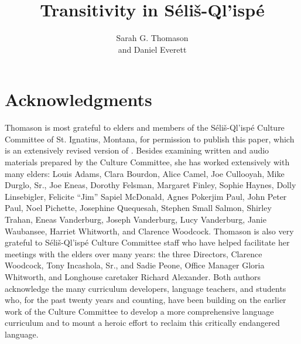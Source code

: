 \documentclass[output=paper,colorlinks,citecolor=brown]{langscibook}
\title{Transitivity in S\'eli\v{s}-Ql'isp\'e}
\author{Sarah G. Thomason \affiliation{University of Michigan}\\ and
       Daniel Everett \affiliation{Bentley University}}
\begin{document}
\maketitle




\section*{Acknowledgments}

Thomason is most
   grateful to elders and members of the S\'eli\v{s}-Ql'isp\'e
   Culture Committee of St. Ignatius, Montana, for permission to
   publish this paper, which is an extensively revised version of
   \cite{S.Thomason&Everett:1993}.  Besides examining written and
   audio materials prepared by the Culture Committee, she has worked
   extensively with many elders: {\dag}Louis Adams, {\dag}Clara
   Bourdon, {\dag}Alice Camel, {\dag}Joe Cullooyah, {\dag}Mike
   Durglo, Sr., {\dag}Joe Eneas, {\dag}Dorothy Felsman,
   {\dag}Margaret Finley, Sophie Haynes, {\dag}Dolly Linsebigler,
   {\dag}Felicite ``Jim'' Sapiel McDonald, {\dag}Agnes Pokerjim Paul,
   {\dag}John Peter Paul, {\dag}Noel Pichette, {\dag}Josephine
   Quequesah, Stephen Small Salmon, Shirley Trahan, {\dag}Eneas
   Vanderburg, {\dag}Joseph Vanderburg, Lucy Vanderburg, {\dag}Janie
   Waubansee, {\dag}Harriet Whitworth, and {\dag}Clarence Woodcock.
   Thomason is also very grateful to S\'eli\v{s}-Ql'isp\'e Culture
   Committee staff who have helped facilitate her meetings with the
   elders over many years: the three Directors, {\dag}Clarence
 Woodcock, {\dag}Tony Incashola, Sr., and Sadie Peone, Office Manager
 {\dag}Gloria Whitworth, and Longhouse caretaker Richard Alexander.
 Both authors acknowledge the many curriculum developers, language
 teachers, and students who, for the past twenty years and counting,
 have been building on the earlier work of the Culture Committee to
 develop a more comprehensive language curriculum and to mount a
 heroic effort to reclaim this critically endangered language.
\end{document}
